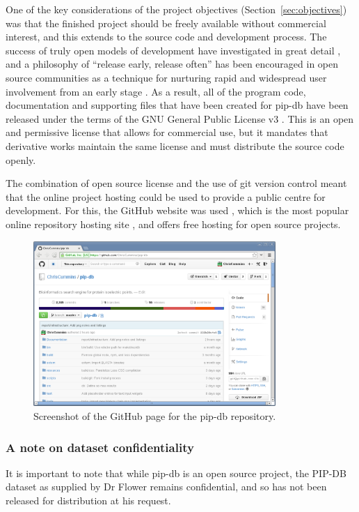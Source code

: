 One of the key considerations of the project objectives
(Section~\ref{sec:objectives}) was that the finished project should be
freely available without commercial interest, and this extends to the
source code and development process. The success of truly open models
of development have investigated in great detail
\cite{weber2004success, godfrey2000evolution, chesbrough2006open,
  von2005democratizing}, and a philosophy of ``release early, release
often'' has been encouraged in open source communities as a technique
for nurturing rapid and widespread user involvement from an early
stage \cite{raymond1999cathedral}. As a result, all of the program
code, documentation and supporting files that have been created for
pip-db have been released under the terms of the GNU General Public
License v3 \cite{gnu2007gpl}. This is an open and permissive license
that allows for commercial use, but it mandates that derivative works
maintain the same license and must distribute the source code openly.

The combination of open source license and the use of git version
control meant that the online project hosting could be used to provide
a public centre for development. For this, the GitHub website was used
\cite{cummins2014pip-db}, which is the most popular online repository
hosting site \cite{finley2011github}, and offers free hosting for open
source projects.


\begin{figure}[H]
\centering
    \includegraphics[width=0.82\textwidth]{assets/github}
\caption[GiHub project homepage]
        {Screenshot of the GitHub page for the pip-db repository.}
\label{fig:github-project}
\end{figure}


\subsubsection*{A note on dataset confidentiality}
It is important to note that while pip-db is an open source project,
the PIP-DB dataset as supplied by Dr Flower remains confidential,
and so has not been released for distribution at his request.

